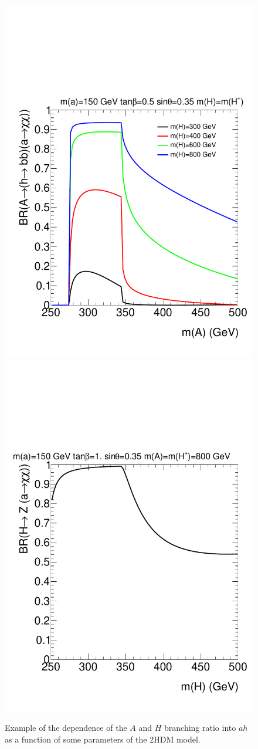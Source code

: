 \begin{figure}
\centering
\includegraphics[width=.48\textwidth]{texinputs/04_grid/figures/DMHF//brA}
\includegraphics[width=.48\textwidth]{texinputs/04_grid/figures/DMHF//brH}
\caption{Example of the dependence of the $A$ and $H$ branching ratio into $ah$ as a function of some parameters of the 2HDM model.}
\label{fig:brAHah}
\end{figure}


